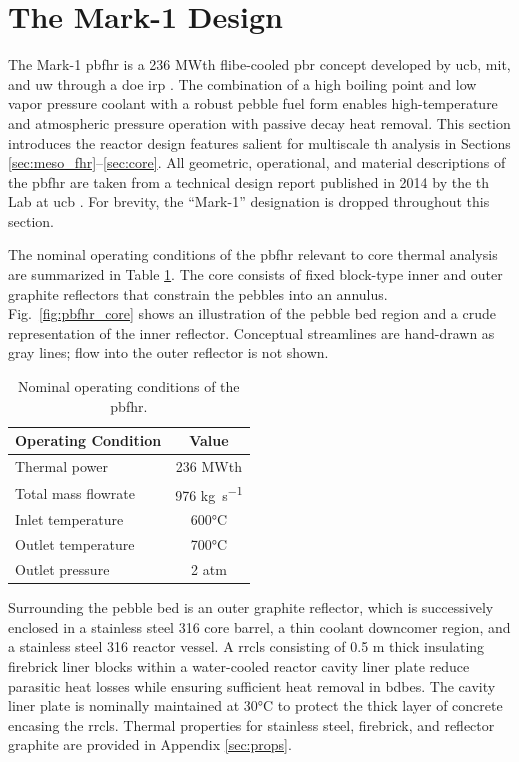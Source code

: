 \section{The Mark-1 Design}
\label{sec:mark1}

The Mark-1 \gls{pbfhr} is a 236 MWth \gls{flibe}-cooled \gls{pbr} concept developed by \gls{ucb}, \gls{mit}, and \gls{uw} through a \gls{doe} \gls{irp} \cite{pbfhr}. The combination of a high boiling point and low vapor pressure coolant with a robust pebble fuel form enables high-temperature and atmospheric pressure operation with passive decay heat removal. This section introduces the reactor design features salient for multiscale \gls{th} analysis in Sections \ref{sec:meso_fhr}--\ref{sec:core}. All geometric, operational, and material descriptions of the \gls{pbfhr} are taken from a technical design report published in 2014 by the \gls{th} Lab at \gls{ucb} \cite{pbfhr}. For brevity, the ``Mark-1'' designation is dropped throughout this section.

The nominal operating conditions of the \gls{pbfhr} relevant to core thermal analysis are summarized in Table \ref{table:operating}. The core consists of fixed block-type inner and outer graphite reflectors that constrain the pebbles into an annulus. Fig.\ \ref{fig:pbfhr_core} shows an illustration of the pebble bed region and a crude representation of the inner reflector. Conceptual streamlines are hand-drawn as gray lines; flow into the outer reflector is not shown.

\begin{table}[htb!]
\caption{Nominal operating conditions of the \gls{pbfhr}.}
\centering
\small
\begin{tabular}{|l|c|}
\hline\hline
Operating Condition & Value\Tstrut\Bstrut\\
\hline
Thermal power & 236 MWth\Tstrut\\
Total mass flowrate & 976 \si{\kilo\gram\per\second}\\
Inlet temperature & 600\si{\celsius}\\
Outlet temperature & 700\si{\celsius}\\
Outlet pressure & 2 atm\Bstrut\\
\hline
\end{tabular}
\label{table:operating}
\end{table}

Surrounding the pebble bed is an outer graphite reflector, which is successively enclosed in a stainless steel 316 core barrel, a thin coolant downcomer region, and a stainless steel 316 reactor vessel. A \gls{rrcls} consisting of 0.5 \si{\meter} thick insulating firebrick liner blocks within a water-cooled reactor cavity liner plate reduce parasitic heat losses while ensuring sufficient heat removal in \glspl{bdbe}. The cavity liner plate is nominally maintained at 30\si{\celsius} to protect the thick layer of concrete encasing the \gls{rrcls}. Thermal properties for stainless steel, firebrick, and reflector graphite are provided in Appendix \ref{sec:props}.

